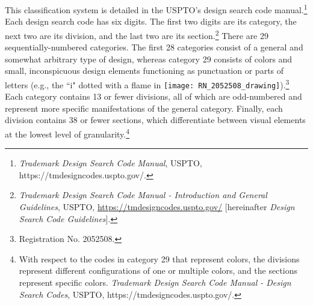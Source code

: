 \documentclass[letterpaper, 11pt, oneside]{article}
\begin{document}
This classification system is detailed in the USPTO's design search code manual.\footnote{\textit{Trademark Design Search Code Manual}, USPTO, https://tmdesigncodes.uspto.gov/.} Each design search code has six digits. The first two digits are its category, the next two are its division, and the last two are its section.\footnote{\label{supra15} \textit{Trademark Design Search Code Manual - Introduction and General Guidelines}, USPTO, \url{https://tmdesigncodes.uspto.gov/} [hereinafter \textit{Design Search Code Guidelines}].} There are 29 sequentially-numbered categories. The first 28 categories consist of a general and somewhat arbitrary type of design, whereas category 29 consists of colors and small, inconspicuous design elements functioning as punctuation or parts of letters (e.g., the ``i" dotted with a flame in \texttt{[image: RN\_2052508\_drawing]}).\footnote{Registration No. 2052508.} Each category contains 13 or fewer divisions, all of which are odd-numbered and represent more specific manifestations of the general category. Finally, each division contains 38 or fewer sections, which differentiate between visual elements at the lowest level of granularity.\footnote{With respect to the codes in category 29 that represent colors, the divisions represent different configurations of one or multiple colors, and the sections represent specific colors. \textit{Trademark Design Search Code Manual - Design Search Codes}, USPTO, https://tmdesigncodes.uspto.gov/.}
\end{document}
